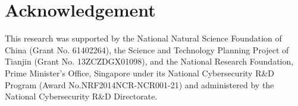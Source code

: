 \section{Acknowledgement}
This research was supported by the National Natural
Science Foundation of China (Grant No. 61402264), the
Science and Technology Planning Project of Tianjin (Grant
No. 13ZCZDGX01098), and the National Research Foundation, Prime Minister’s Office, Singapore under its National Cybersecurity 
R\&D Program (Award No.NRF2014NCR-NCR001-21) and administered by the National Cybersecurity R\&D Directorate. 
